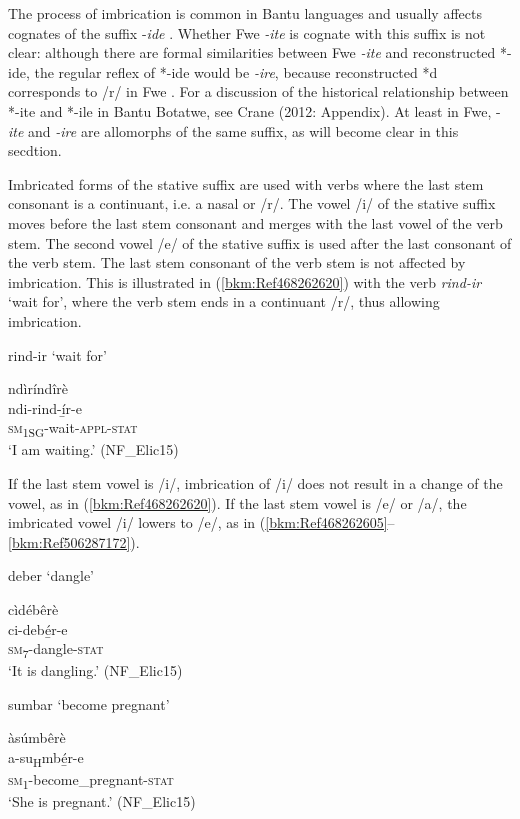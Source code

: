 The process of imbrication is common in Bantu languages and usually affects cognates of the suffix -\textit{ide} \citep{Bastin1983}. Whether Fwe \textit{-ite} is cognate with this suffix is not clear: although there are formal similarities between Fwe \textit{-ite} and reconstructed *-ide, the regular reflex of *-ide would be \textit{-ire}, because reconstructed *d corresponds to /r/ in Fwe \citep[114-115]{Bostoen2009}. For a discussion of the historical relationship between *-ite and *-ile in Bantu Botatwe, see Crane (2012: Appendix). At least in Fwe, -\textit{\-ite} and \textit{-ire} are allomorphs of the same suffix, as will become clear in this secdtion.

Imbricated forms of the stative suffix are used with verbs where the last stem consonant is a continuant, i.e. a nasal or /r/. The vowel /i/ of the stative suffix moves before the last stem consonant and merges with the last vowel of the verb stem. The second vowel /e/ of the stative suffix is used after the last consonant of the verb stem. The last stem consonant of the verb stem is not affected by imbrication. This is illustrated in (\ref{bkm:Ref468262620}) with the verb \textit{rind-ir} ‘wait for’, where the verb stem ends in a continuant /r/, thus allowing imbrication.

\ea
\label{bkm:Ref468262620}
\ea
rind-ir ‘wait for’

\ex
\glll ndìríndîrè\\
ndi-rind-í̲r-e\\
\textsc{sm}\textsubscript{1SG}-wait-\textsc{appl}-\textsc{stat}\\
\glt ‘I am waiting.’ (NF\_Elic15)
\z\z

If the last stem vowel is /i/, imbrication of /i/ does not result in a change of the vowel, as in (\ref{bkm:Ref468262620}). If the last stem vowel is /e/ or /a/, the imbricated vowel /i/ lowers to /e/, as in (\ref{bkm:Ref468262605}--\ref{bkm:Ref506287172}).

\ea
\label{bkm:Ref468262605}
\ea
deber ‘dangle’

\ex
\glll cìdébêrè\\
ci-debé̲r-e\\
\textsc{sm}\textsubscript{7}-dangle-\textsc{stat}\\
\glt ‘It is dangling.’ (NF\_Elic15)
\z\z

\ea
\label{bkm:Ref506287172}
\ea
sumbar ‘become pregnant’

\ex
\glll àsúmbêrè\\
a-su\textsubscript{H}mbé̲r-e\\
\textsc{sm}\textsubscript{1}-become\_pregnant-\textsc{stat}\\
\glt ‘She is pregnant.’ (NF\_Elic15)
\z\z

